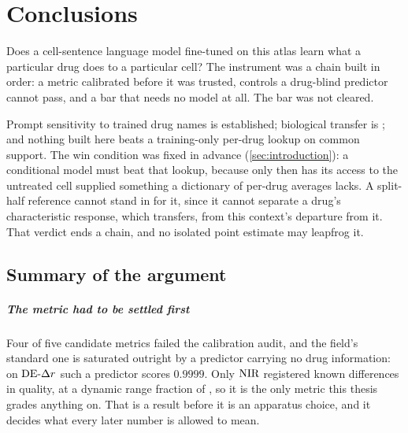 
\chapter{Conclusions}
\label{sec:conclusions}

\begin{question}
Does a cell-sentence language model fine-tuned on this atlas learn what a
particular drug does to a particular cell? The instrument was a chain built in
order: a metric calibrated before it was trusted, controls a drug-blind
predictor cannot pass, and a bar that needs no model at all. The bar was not
cleared.
\end{question}

\noindent
Prompt sensitivity to trained drug names is established; biological transfer is
\notestablished; and nothing built here beats a training-only per-drug lookup on
common support. The win condition was fixed in advance
(\cref{sec:introduction}): a conditional model must beat that lookup, because
only then has its access to the untreated cell supplied something a dictionary
of per-drug averages lacks. A split-half reference cannot stand in for it, since
it cannot separate a drug's characteristic response, which transfers, from this
context's departure from it. That verdict ends a chain, and no isolated point
estimate may leapfrog it.

\section{Summary of the argument}

\paragraph{The metric had to be settled first} Four of five candidate metrics failed the calibration audit, and the field's standard one is saturated outright by a predictor carrying no drug information: on $\textrm{DE-}\Delta r$ such a predictor scores $0.9999$. Only $\textrm{NIR}$ registered known differences in quality,
at a dynamic range fraction of , so it is the only
metric this thesis grades anything on. That is a result before it is an
apparatus choice, and it decides what every later number is allowed to mean.


